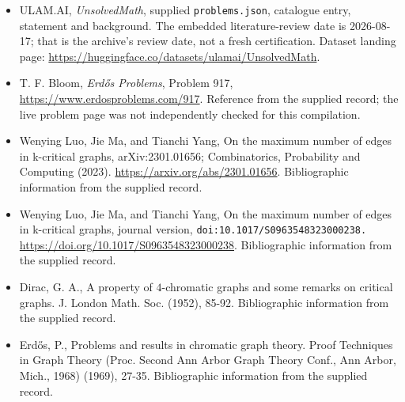 \documentclass[11pt,a4paper]{article}
\begin{document}
{\small

\begin{itemize}

\item[\hypertarget{source:statement:1}{S1}] ULAM.AI, \emph{UnsolvedMath}, supplied \texttt{problems.json}, catalogue entry, statement and background. The embedded literature-review date is 2026-08-17; that is the archive’s review date, not a fresh certification. Dataset landing page: \url{https://huggingface.co/datasets/ulamai/UnsolvedMath}.

\item[\hypertarget{source:statement:2}{S2}] T. F. Bloom, \emph{Erdős Problems}, Problem 917, \url{https://www.erdosproblems.com/917}. Reference from the supplied record; the live problem page was not independently checked for this compilation.

\item[\hypertarget{source:statement:3}{S3}] Wenying Luo, Jie Ma, and Tianchi Yang, On the maximum number of edges in k-critical graphs, arXiv:2301.01656; Combinatorics, Probability and Computing (2023). \url{https://arxiv.org/abs/2301.01656}. Bibliographic information from the supplied record.

\item[\hypertarget{source:statement:4}{S4}] Wenying Luo, Jie Ma, and Tianchi Yang, On the maximum number of edges in k-critical graphs, journal version, \nolinkurl{doi:10.1017/S0963548323000238.} \url{https://doi.org/10.1017/S0963548323000238}. Bibliographic information from the supplied record.

\item[\hypertarget{source:statement:5}{S5}] Dirac, G. A., A property of {$4$}-chromatic graphs and some remarks on critical graphs. J. London Math. Soc. (1952), 85-92. Bibliographic information from the supplied record.

\item[\hypertarget{source:statement:6}{S6}] Erd\H{o}s, P., Problems and results in chromatic graph theory. Proof Techniques in Graph Theory (Proc. Second Ann Arbor Graph Theory Conf., Ann Arbor, Mich., 1968) (1969), 27-35. Bibliographic information from the supplied record.

\end{itemize}

}

\label{end:statement}
\end{document}
